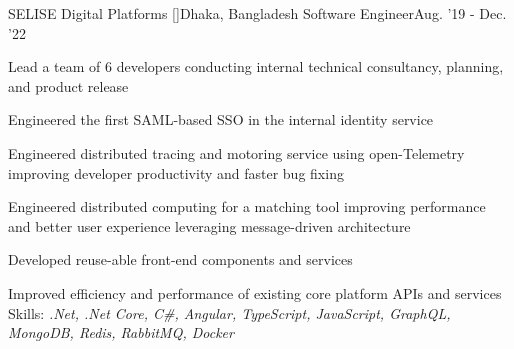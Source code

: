  \resumeSubheading
    {SELISE Digital Platforms [\href{https://selisegroup.com/}{}]}{Dhaka, Bangladesh}
    {Software Engineer}{Aug. '19 - Dec. '22}
    \resumeItemListStart
   \item Lead a team of 6 developers conducting internal technical consultancy, planning, and product release
   \item Engineered the first SAML-based SSO in the internal identity service
   \item Engineered distributed tracing and motoring service using open-Telemetry improving developer productivity and faster bug fixing
   \item Engineered distributed computing for a matching tool improving performance and better user experience leveraging message-driven architecture
  \item Developed reuse-able front-end components and services
   \item Improved efficiency and performance of existing core platform APIs and services
      {\\Skills: \emph{.Net, .Net Core, C\#, Angular, TypeScript, JavaScript, GraphQL, MongoDB, Redis, RabbitMQ, Docker}}
    \resumeItemListEnd
  \resumeSubHeadingListEnd
\vspace{-6mm}